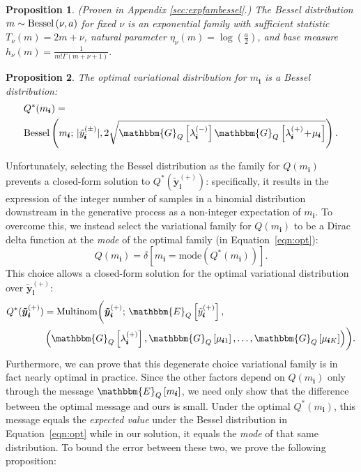 \documentclass[letterpaper]{article}
\newcommand{\subs}{\pmb{i}}
\newcommand{\wsup}[2]{#1_{\subs}^{(#2)}}
\newcommand{\ytP}{\wsup{\tilde{y}}{+}}
\newcommand{\ytPM}{\wsup{\tilde{y}}{\pm}}
\newcommand{\lamP}{\wsup{\lambda}{+}}
\newcommand{\lamM}{\wsup{\lambda}{-}}
\newcommand{\mus}{\mu_{\subs}}
\newcommand{\ms}{m_{\subs}}
\newcommand{\Bess}[1]{\textup{Bessel}\left( #1 \right)}
\newcommand{\Eq}[1]{\mathbbm{E}_Q\left[#1\right]}
\newcommand{\Gq}[1]{\mathbbm{G}_Q\left[#1\right]}
\newcommand{\teq}{\!=\!}
\newcommand{\tp}{\!+\!}
\newcommand{\yvtP}{\boldsymbol{\tilde{y}}_{\subs}^{(+)}}
\newtheorem{proposition}{Proposition}
\begin{document}
  \begin{proposition} (Proven in Appendix \ref{sec:expfambessel}.) The Bessel
  distribution $m \sim \Bess{\nu, a}$ for fixed $\nu$ is an exponential family
  with sufficient statistic $T_{\nu}(m) \teq 2m \tp \nu$, natural parameter
  $\eta_{\nu}(m)\teq \log(\frac{a}{2})$, and base measure $h_{\nu}(m) \teq
  \frac{1}{m!\Gamma(m\tp\nu\tp 1)}$. 
  \end{proposition}
  
  \begin{proposition} The optimal variational distribution for $\ms$ is a Bessel
  distribution:
  \begin{align}
  \label{eqn:opt}
  \begin{split}
  &Q^*(\ms) =\\
  &\Bess{\ms; \, |\ytPM|, 2\sqrt{\Gq{\lamM}\Gq{\lamP \tp \mus}}}.
  \end{split}
  \end{align}
  \end{proposition}
  
  Unfortunately, selecting the Bessel distribution as the family for $Q(\ms)$
  prevents a closed-form solution to $Q^*(\yvtP)$: specifically, it results in
  the expression of the integer number of samples in a binomial distribution
  downstream in the generative process as a non-integer expectation of $\ms$. To
  overcome this, we instead select the variational family for $Q(\ms)$ to be a
  Dirac delta function at the \emph{mode} of the optimal family (in
  Equation~\ref{eqn:opt}):
  \begin{equation}
  Q(\ms) = \delta\left[\ms \teq \textrm{mode}(Q^*(\ms))\right].
  \end{equation}
  This choice allows a closed-form solution for the optimal variational
  distribution over $\yvtP$:
  \begin{align}
  \label{eqn:opt-multi}
  \begin{split}
  Q^*(\yvtP) &= \textup{Multinom} \biggl(\yvtP;\, \Eq{\ytP},\\
  &\left(\Gq{\lamP}, \Gq{\mu_{\subs 1}}, \dots, \Gq{\mu_{\subs K}} \right) \biggr).
  \end{split}
  \end{align}
  Furthermore, we can prove that this degenerate choice variational family is in
  fact nearly optimal in practice. Since the other factors depend on $Q(\ms)$
  only through the message $\Eq{\ms}$, we need only show that the difference
  between the optimal message and ours is small. Under the optimal $Q^*(\ms)$,
  this message equals the \emph{expected value} under the Bessel distribution in
  Equation~\ref{eqn:opt} while in our solution, it equals the \emph{mode} of
  that same distribution. To bound the error between these two, we prove the
  following proposition:
  
\end{document}
